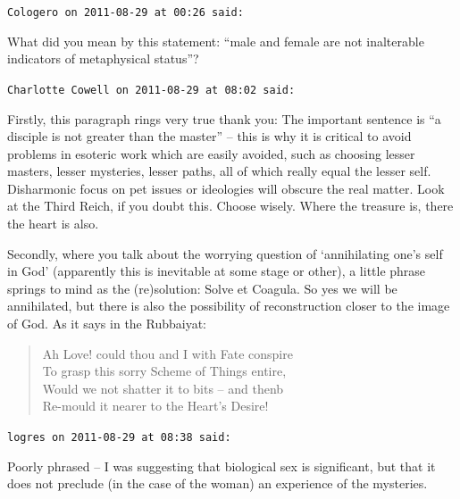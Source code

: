 \begin{footnotesize}
\begin{sffamily}
\texttt{Cologero on 2011-08-29 at 00:26 said:}

What did you mean by this statement: ``male and female are not inalterable indicators of metaphysical status''?

\hfill

\texttt{Charlotte Cowell on 2011-08-29 at 08:02 said:}

Firstly, this paragraph rings very true thank you: The important sentence is ``a disciple is not greater than the master'' -- this is why it is critical to avoid problems in esoteric work which are easily avoided, such as choosing lesser masters, lesser mysteries, lesser paths, all of which really equal the lesser self. Disharmonic focus on pet issues or ideologies will obscure the real matter. Look at the Third Reich, if you doubt this. Choose wisely. Where the treasure is, there the heart is also.

Secondly, where you talk about the worrying question of `annihilating one's self in God' (apparently this is inevitable at some stage or other), a little phrase springs to mind as the (re)solution: Solve et Coagula. So yes we will be annihilated, but there is also the possibility of reconstruction closer to the image of God. As it says in the Rubbaiyat:

\begin{verse}
Ah Love! could thou and I with Fate conspire\\
To grasp this sorry Scheme of Things entire,\\
Would we not shatter it to bits -- and thenb\\
Re-mould it nearer to the Heart's Desire!
\end{verse}

\hfill

\texttt{logres on 2011-08-29 at 08:38 said:}

Poorly phrased -- I was suggesting that biological sex is significant, but that it does not preclude (in the case of the woman) an experience of the mysteries.


\hfill

\end{sffamily}
\end{footnotesize}

